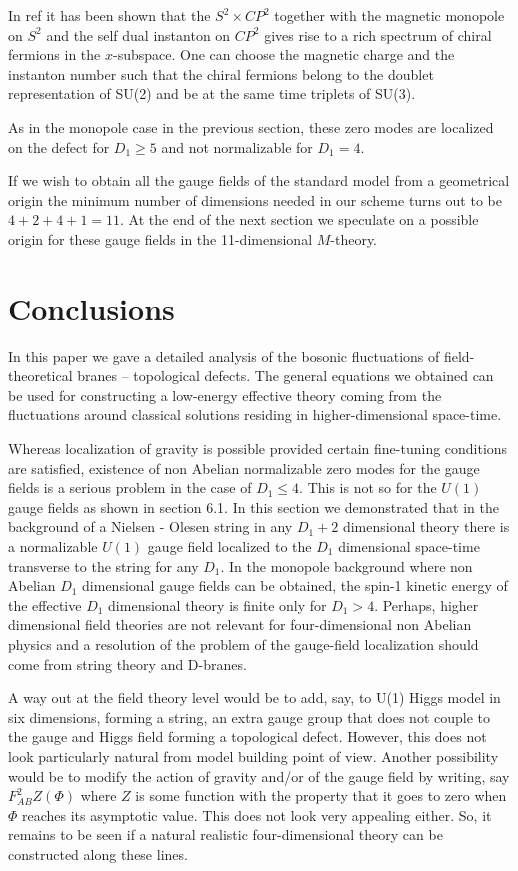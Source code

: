\documentclass[a4paper,12pt]{article}
\begin{document}
In ref \cite{Dvali:2001qr} it has been shown that the $S^2\times
CP^2$ together with the magnetic monopole on $S^2$ and the self dual
instanton on $CP^2$ gives rise to a rich spectrum of chiral fermions
in the $x$-subspace. One can choose the magnetic charge and the
instanton number such that the chiral fermions belong to the doublet
representation of SU(2) and be at the same time triplets of SU(3).

As in the monopole case in the previous section, these zero modes are
localized on the defect for $D_1 \geq 5$ and not normalizable for
$D_1=4$.

If we wish to obtain all the gauge fields of the standard model from
a geometrical origin the minimum number of dimensions needed in our
scheme turns out to be $4+2+4+1=11$.  At the end of the next section
we speculate on a possible origin for these gauge fields in the
11-dimensional $M$-theory.


\section{Conclusions}

In this paper we gave a detailed analysis of the bosonic fluctuations
of field-theoretical branes -- topological defects. The general
equations we obtained can be used for constructing a low-energy
effective theory coming from the fluctuations around classical
solutions residing in higher-dimensional space-time.

Whereas localization of gravity is possible provided certain
fine-tuning conditions are satisfied, existence of non Abelian
normalizable zero modes for the gauge fields is a serious problem
in the case of $D_1\leq 4$. This is not so for the $U(1)$ gauge
fields as shown in section 6.1. In this section we demonstrated
that in the background of a Nielsen - Olesen string in any $D_1+2$
dimensional theory there is a normalizable $U(1)$ gauge field
localized to the $D_1$ dimensional space-time transverse to the
string for any $D_1$.
 In the monopole background where  non Abelian $D_1$
dimensional gauge fields can be obtained, the spin-1 kinetic
energy of the effective $D_1$ dimensional theory is finite only
for $D_1 > 4$. Perhaps, higher dimensional field theories are not
 relevant for four-dimensional non Abelian physics and a
resolution of the problem of the gauge-field localization should
come from string theory and D-branes.

A way out at the field theory level would be to add, say, to U(1)
Higgs model in six dimensions, forming a string, an extra gauge
group that does not couple to the gauge and Higgs field forming a
topological defect. However, this does not look particularly
natural from model building point of view. Another possibility
would be to modify the action of gravity and/or of the gauge field
by writing, say $F_{AB}^2 Z(\Phi)$ where $Z$ is some function with
the property that it goes to zero when $\Phi$ reaches its
asymptotic value. This does not look very appealing either. So, it
remains to be seen if a natural realistic four-dimensional theory
can be constructed along these lines.
\end{document}
